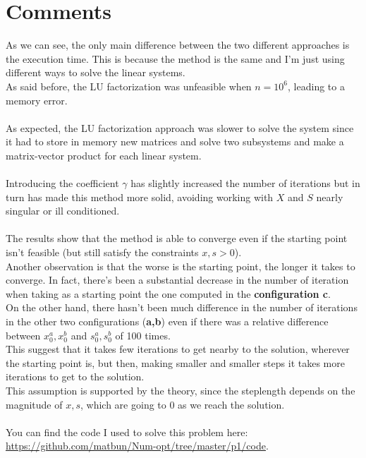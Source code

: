\documentclass[]{article}
\begin{document}
\section{Comments}
As we can see, the only main difference between the two different approaches is the execution time. This is because the method is the same and I'm just using different ways to solve the linear systems. \\
As said before, the LU factorization was unfeasible when $n=10^6$, leading to a memory error.\\\\
As expected, the LU factorization approach was slower to solve the system since it had to store in memory new matrices and solve two subsystems and make a matrix-vector product for each linear system.\\\\
Introducing the coefficient $\gamma$ has slightly increased the number of iterations but in turn has made this method more solid, avoiding working with $X$ and $S$ nearly singular or ill conditioned.\\\\
The results show that the method is able to converge even if the starting point isn't feasible (but still satisfy the constraints $x,s > 0$).\\
Another observation is that the worse is the starting point, the longer it takes to converge. In fact, there's been a substantial decrease in the number of iteration when taking as a starting point the one computed in the \textbf{configuration c}. \\
On the other hand, there hasn't been much difference in the number of iterations in the other two configurations (\textbf{a,b}) even if there was a relative difference between $x_0^a, x_0^b$ and $s_0^a, s_0^b$ of 100 times. \\
This suggest that it takes few iterations to get nearby to the solution, wherever the starting point is, but then, making smaller and smaller steps it takes more iterations to get to the solution.\\
This assumption is supported by the theory, since the steplength depends on the magnitude of $x,s$, which are going to 0 as we reach the solution.\\\\
You can find the code I used to solve this problem here: \url{https://github.com/matbun/Num-opt/tree/master/p1/code}.
\end{document}
